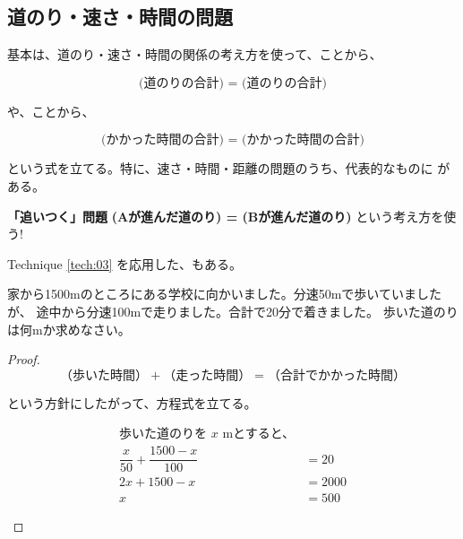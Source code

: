 \subsection{道のり・速さ・時間の問題}

    基本は、道のり・速さ・時間の関係の考え方を使って、ことから、

    \[\textbf{(道のりの合計) = (道のりの合計)}\]

    や、ことから、

    \[\textbf{(かかった時間の合計) = (かかった時間の合計)}\]

    \vspace{1.5em}
    という式を立てる。特に、速さ・時間・距離の問題のうち、代表的なものに
    がある。
    \vspace{1em}

    \begin{techniquebox}[tech:03]{\textbf{「追いつく」問題}}
        \textbf{(Aが進んだ道のり) = (Bが進んだ道のり)} という考え方を使う!
    \end{techniquebox}

    \vspace{1em}
    Technique \ref{tech:03} を応用した、もある。

    \begin{example}[【例題 2】]
        家から1500mのところにある学校に向かいました。分速50mで歩いていましたが、
        途中から分速100mで走りました。合計で20分で着きました。
        歩いた道のりは何mか求めなさい。
    \end{example}

    \begin{proof}\mbox{}\\
        \[（歩いた時間）+（走った時間）=（合計でかかった時間）\]

        という方針にしたがって、方程式を立てる。

        \begin{hiddenanswer}
            \begin{align*}
                \text{歩いた道のりを $x$ mとすると、}\\
                \dfrac{x}{50} + \dfrac{1500 - x}{100} &= 20 \\
                2x + 1500 - x &= 2000 \\
                x &= 500
            \end{align*}

        \end{hiddenanswer}
    \end{proof}
\newpage

